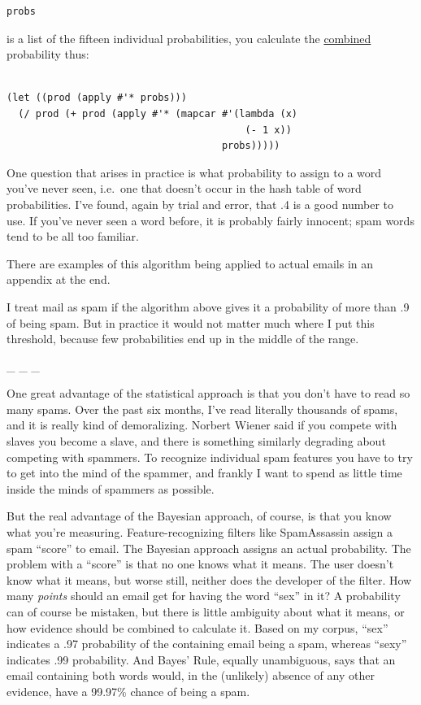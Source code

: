 \begin{verbatim}
probs
\end{verbatim}

is a list of the fifteen individual probabilities, you calculate the
\href{naivebayes.html}{combined} probability thus:

\begin{verbatim}

(let ((prod (apply #'* probs)))
  (/ prod (+ prod (apply #'* (mapcar #'(lambda (x) 
                                         (- 1 x))
                                     probs)))))
\end{verbatim}

One question that arises in practice is what probability to assign to a
word you've never seen, i.e.~one that doesn't occur in the hash table of
word probabilities. I've found, again by trial and error, that .4 is a
good number to use. If you've never seen a word before, it is probably
fairly innocent; spam words tend to be all too familiar.

There are examples of this algorithm being applied to actual emails in
an appendix at the end.

I treat mail as spam if the algorithm above gives it a probability of
more than .9 of being spam. But in practice it would not matter much
where I put this threshold, because few probabilities end up in the
middle of the range.

\_ \_ \_

One great advantage of the statistical approach is that you don't have
to read so many spams. Over the past six months, I've read literally
thousands of spams, and it is really kind of demoralizing. Norbert
Wiener said if you compete with slaves you become a slave, and there is
something similarly degrading about competing with spammers. To
recognize individual spam features you have to try to get into the mind
of the spammer, and frankly I want to spend as little time inside the
minds of spammers as possible.

But the real advantage of the Bayesian approach, of course, is that you
know what you're measuring. Feature-recognizing filters like
SpamAssassin assign a spam ``score'' to email. The Bayesian approach
assigns an actual probability. The problem with a ``score'' is that no
one knows what it means. The user doesn't know what it means, but worse
still, neither does the developer of the filter. How many \emph{points}
should an email get for having the word ``sex'' in it? A probability can
of course be mistaken, but there is little ambiguity about what it
means, or how evidence should be combined to calculate it. Based on my
corpus, ``sex'' indicates a .97 probability of the containing email
being a spam, whereas ``sexy'' indicates .99 probability. And Bayes'
Rule, equally unambiguous, says that an email containing both words
would, in the (unlikely) absence of any other evidence, have a 99.97\%
chance of being a spam.

